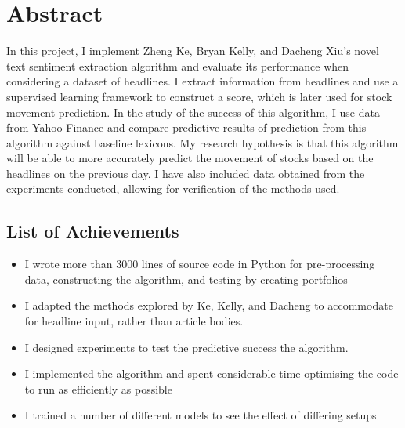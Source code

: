 \documentclass[ oneside,%
                    author={Joshua Felmeden},
                    degree={MEng},
                     title={Sentiment Analysis of Financial Headlines Based on Realised Stock Returns},
                  subtitle={Research}]{dissertation}
\begin{document}
\frontmatter





\chapter*{Abstract}


In this project, I implement Zheng Ke, Bryan Kelly, and Dacheng Xiu's novel text sentiment extraction algorithm and evaluate its performance when considering a dataset of headlines. I extract information from headlines and use a supervised learning framework to construct a score, which is later used for stock movement prediction. In the study of the success of this algorithm, I use data from Yahoo Finance and compare predictive results of prediction from this algorithm against baseline lexicons. My research hypothesis is that this algorithm will be able to more accurately predict the movement of stocks based on the headlines on the previous day. I have also included data obtained from the experiments conducted, allowing for verification of the methods used.

\section*{List of Achievements}
\begin{itemize}
      \item I wrote more than 3000 lines of source code in Python for pre-processing data, constructing the algorithm, and testing by creating portfolios
      \item I adapted the methods explored by Ke, Kelly, and Dacheng to accommodate for headline input, rather than article bodies.
      \item I designed experiments to test the predictive success the algorithm.
      \item I implemented the algorithm and spent considerable time optimising the code to run as efficiently as possible
      \item I trained a number of different models to see the effect of differing setups
\end{itemize}
\end{document}
